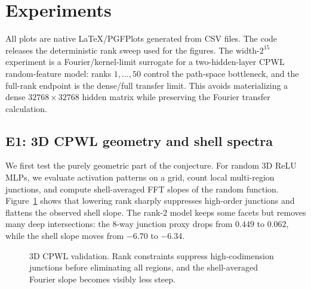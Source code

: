 \documentclass[10pt,twocolumn]{article}
\newcommand{\1}{\mathbf{1}}
\begin{document}
\section{Experiments}
All plots are native \LaTeX/PGFPlots generated from CSV files.  The code releases the deterministic rank sweep used for the figures.  The width-$2^{15}$ experiment is a Fourier/kernel-limit surrogate for a two-hidden-layer CPWL random-feature model: ranks $1,\ldots,50$ control the path-space bottleneck, and the full-rank endpoint is the dense/full transfer limit.  This avoids materializing a dense $32768\times32768$ hidden matrix while preserving the Fourier transfer calculation.

\subsection{E1: 3D CPWL geometry and shell spectra}
We first test the purely geometric part of the conjecture.  For random 3D ReLU MLPs, we evaluate activation patterns on a grid, count local multi-region junctions, and compute shell-averaged FFT slopes of the random function.  Figure~\ref{fig:cpwl3d} shows that lowering rank sharply suppresses high-order junctions and flattens the observed shell slope.  The rank-$2$ model keeps some facets but removes many deep intersections: the 8-way junction proxy drops from $0.449$ to $0.062$, while the shell slope moves from $-6.70$ to $-6.34$.

\begin{figure}[t]
\centering
{}
\caption{3D CPWL validation.  Rank constraints suppress high-codimension junctions before eliminating all regions, and the shell-averaged Fourier slope becomes visibly less steep.}
\label{fig:cpwl3d}
\end{figure}
\end{document}
